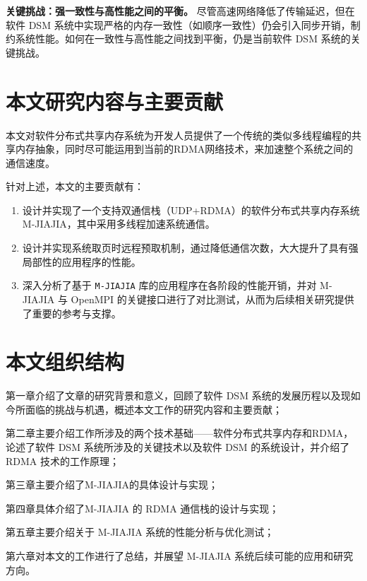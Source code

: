 {  \textbf{关键挑战：强一致性与高性能之间的平衡。} 尽管高速网络降低了传输延迟，但在软件 DSM 系统中实现严格的内存一致性（如顺序一致性）仍会引入同步开销，制约系统性能。如何在一致性与高性能之间找到平衡，仍是当前软件 DSM 系统的关键挑战。

  \section{本文研究内容与主要贡献}
  本文对软件分布式共享内存系统为开发人员提供了一个传统的类似多线程编程的共享内存抽象，同时尽可能运用到当前的RDMA网络技术，来加速整个系统之间的通信速度。

  针对上述，本文的主要贡献有：
  \begin{enumerate}[leftmargin=1em, align=left]
    \item 设计并实现了一个支持双通信栈（UDP+RDMA）的软件分布式共享内存系统 M-JIAJIA，其中采用多线程加速系统通信。
    \item 设计并实现系统取页时远程预取机制，通过降低通信次数，大大提升了具有强局部性的应用程序的性能。
    \item 深入分析了基于 \texttt{M-JIAJIA} 库的应用程序在各阶段的性能开销，并对 M-JIAJIA 与 OpenMPI 的关键接口进行了对比测试，从而为后续相关研究提供了重要的参考与支撑。
  \end{enumerate}
  \section{本文组织结构}
  第一章介绍了文章的研究背景和意义，回顾了软件 DSM 系统的发展历程以及现如今所面临的挑战与机遇，概述本文工作的研究内容和主要贡献；

  第二章主要介绍工作所涉及的两个技术基础——软件分布式共享内存和RDMA，论述了软件 DSM 系统所涉及的关键技术以及软件 DSM 的系统设计，并介绍了 RDMA 技术的工作原理；

  第三章主要介绍了M-JIAJIA的具体设计与实现；

  第四章具体介绍了M-JIAJIA 的 RDMA 通信栈的设计与实现；

  第五章主要介绍关于 M-JIAJIA 系统的性能分析与优化测试；

  第六章对本文的工作进行了总结，并展望 M-JIAJIA 系统后续可能的应用和研究方向。
}

